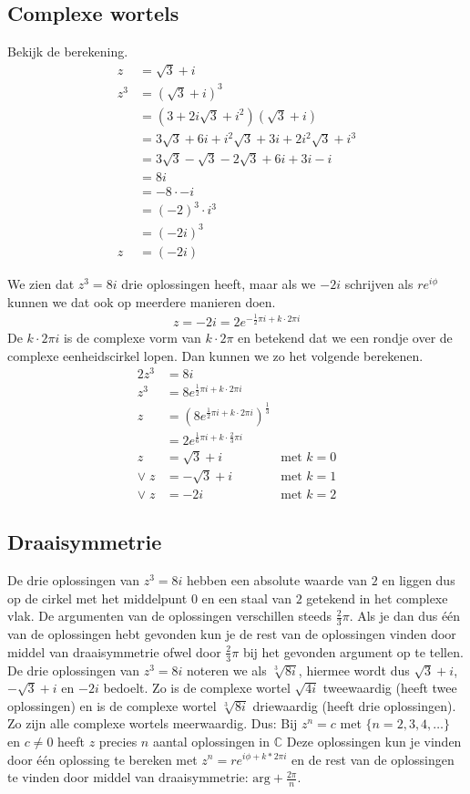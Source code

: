 \documentclass[11pt,fleqn]{book} %
\begin{document}
\subsection{Complexe wortels}
Bekijk de berekening.
\begin{align*}
z &= \sqrt{3}+i\\
z^3 &= (\sqrt{3}+i)^3\\
&= (3+2i\sqrt{3}+i^2)(\sqrt{3}+i)\\
&= 3\sqrt{3}+6i+i^2\sqrt{3}+3i+2i^2\sqrt{3}+i^3\\
&= 3\sqrt{3}-\sqrt{3}-2\sqrt{3}+6i+3i-i\\
&= 8i\\
&= -8\cdot -i\\
&= (-2)^3\cdot i^3\\
&= (-2i)^3\\
z &= (-2i)
\end{align*}

We zien dat $z^3=8i$ drie oplossingen heeft, maar als we $-2i$ schrijven als $re^{i\phi}$ kunnen we dat ook op meerdere manieren doen.
\begin{align*}
z=-2i=2e^{-\frac{1}{2}\pi i+k\cdot 2\pi i}
\end{align*}
De $k\cdot 2\pi i$ is de complexe vorm van $k\cdot 2\pi$ en betekend dat we een rondje over de complexe eenheidscirkel lopen. Dan kunnen we zo het volgende berekenen.
\begin{alignat*}{2}
z^3 &=8i &\\
z^3 &=8e^{\frac{1}{2}\pi i +k\cdot 2\pi i} &\\
z &={(8e^{\frac{1}{2}\pi i +k\cdot 2\pi i})}^{\frac{1}{3}} &\\
&= 2e^{\frac{1}{6}\pi i+k\cdot \frac{2}{3}\pi i} &\\
z &=\sqrt{3}+i\quad &\text{met }k=0 \\
\vee \; z &=-\sqrt{3}+i\quad &\text{met }k=1\\
\vee \; z &=-2i\quad &\text{met }k=2
\end{alignat*}

\subsection{Draaisymmetrie}
De drie oplossingen van $z^3=8i$ hebben een absolute waarde van $2$ en liggen dus op de cirkel met het middelpunt $0$ en een staal van $2$ getekend in het complexe vlak. De argumenten van de oplossingen verschillen steeds $\frac{2}{3}\pi$. Als je dan dus één van de oplossingen hebt gevonden kun je de rest van de oplossingen vinden door middel van draaisymmetrie ofwel door $\frac{2}{3}\pi$ bij het gevonden argument op te tellen. De drie oplossingen van $z^3=8i$ noteren we als $\sqrt[3]{8i}$, hiermee wordt dus $\sqrt{3}+i$, $-\sqrt{3}+i$ en $-2i$ bedoelt.
Zo is de complexe wortel $\sqrt{4i}$ tweewaardig (heeft twee oplossingen) en is de complexe wortel $\sqrt[3]{8i}$ driewaardig (heeft drie oplossingen). Zo zijn alle complexe wortels meerwaardig. Dus:
Bij $z^n=c$ met $\{n=2, 3, 4, \ldots\}$ en $c\neq 0$ heeft $z$ precies $n$ aantal oplossingen in $\mathbb{C}$
Deze oplossingen kun je vinden door één oplossing te bereken met $z^n=re^{i\phi+k*2\pi i}$ en de rest van de oplossingen te vinden door middel van draaisymmetrie: $\text{arg}+\frac{2\pi}{n}$.
\end{document}
